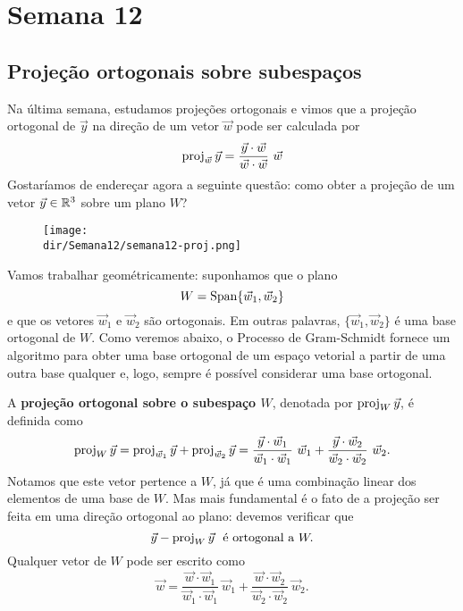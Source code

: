 \documentclass[../livro.tex]{subfiles}  %
\providecommand{\dir}{..}
\begin{document}


\chapter{Semana 12}

\section{Projeção ortogonais sobre subespaços}

Na última semana, estudamos projeções ortogonais e vimos que a projeção ortogonal de $\vec{y}$ na direção de um vetor $\vec{w}$ pode ser calculada por
\[
\proj_{\vec{w}} \vec{y} = \frac{\vec{y} \cdot \vec{w}}{\vec{w} \cdot \vec{w}} \ \vec{w}
\] Gostaríamos de endereçar agora a seguinte questão: como obter a projeção de um vetor $\vec{y} \in \mathbb{R}^3$ sobre um plano $W$?

\begin{figure}[h!]
\begin{center}
\texttt{[image: \\dir/Semana12/semana12-proj.png]}
\end{center}
\end{figure}
\noindent Vamos trabalhar geométricamente: suponhamos que o plano
\[
W = \operatorname{Span} \{\vec{w}_1, \vec{w}_2\}
\] e que os vetores $\vec{w}_1$ e $\vec{w}_2$ são ortogonais. Em outras palavras, $\{\vec{w}_1, \vec{w}_2\}$ é uma base ortogonal de $W$. Como veremos abaixo, o Processo de Gram-Schmidt fornece um algoritmo para obter uma base ortogonal de um espaço vetorial a partir de uma outra base qualquer e, logo, sempre é possível considerar uma base ortogonal.

A \textbf{projeção ortogonal sobre o subespaço $W$}, denotada por $\operatorname{proj}_W \vec{y}$, é definida como
\[
\operatorname{proj}_W \vec{y} = \operatorname{proj}_{\vec{w}_1} \vec{y} + \operatorname{proj}_{\vec{w}_2} \vec{y} = \frac{\vec{y} \cdot \vec{w}_1}{\vec{w}_1 \cdot \vec{w}_1} \ \vec{w}_1 + \frac{\vec{y} \cdot \vec{w}_2}{\vec{w}_2 \cdot \vec{w}_2} \ \vec{w}_2.
\] Notamos que este vetor pertence a $W$, já que é uma combinação linear dos elementos de uma base de $W$. Mas mais fundamental é o fato de a projeção ser feita em uma direção ortogonal ao plano: devemos verificar que
\[
\vec{y} - \operatorname{proj}_W \vec{y} \ \text{ é ortogonal a }  W.
\] Qualquer vetor de $W$ pode ser escrito como
\[
\vec{w} = \frac{\vec{w} \cdot \vec{w}_1}{\vec{w}_1 \cdot \vec{w}_1} \ \vec{w}_1 + \frac{\vec{w} \cdot \vec{w}_2}{\vec{w}_2 \cdot \vec{w}_2} \ \vec{w}_2.
\]
\end{document}
